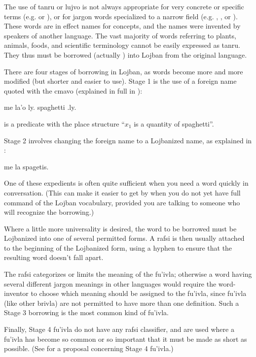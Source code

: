 The use of tanru or lujvo is not always appropriate for very concrete or specific terms (e.g.  or ), or for jargon words specialized to a narrow field (e.g. , , or ). These words are in effect names for concepts, and the names were invented by speakers of another language. The vast majority of words referring to plants, animals, foods, and scientific terminology cannot be easily expressed as tanru. They thus must be borrowed (actually ) into Lojban from the original language.

There are four stages of borrowing in Lojban, as words become more and more modified (but shorter and easier to use). Stage 1 is the use of a foreign name quoted with the cmavo  (explained in full in ):
\begin{example}
me la'o ly. spaghetti .ly.
\end{example}

{\noindent}is a predicate with the place structure ``$x_1$ is a quantity of spaghetti''. 

Stage 2 involves changing the foreign name to a Lojbanized name, as explained in :
\begin{example}
me la spagetis.
\end{example}

One of these expedients is often quite sufficient when you need a word quickly in conversation. (This can make it easier to get by when you do not yet have full command of the Lojban vocabulary, provided you are talking to someone who will recognize the borrowing.)

Where a little more universality is desired, the word to be borrowed must be Lojbanized into one of several permitted forms. A rafsi is then usually attached to the beginning of the Lojbanized form, using a hyphen to ensure that the resulting word doesn't fall apart.

The rafsi categorizes or limits the meaning of the fu'ivla; otherwise a word having several different jargon meanings in other languages would require the word-inventor to choose which meaning should be assigned to the fu'ivla, since fu'ivla (like other brivla) are not permitted to have more than one definition. Such a Stage 3 borrowing is the most common kind of fu'ivla.

Finally, Stage 4 fu'ivla do not have any rafsi classifier, and are used where a fu'ivla has become so common or so important that it must be made as short as possible. (See  for a proposal concerning Stage 4 fu'ivla.)

